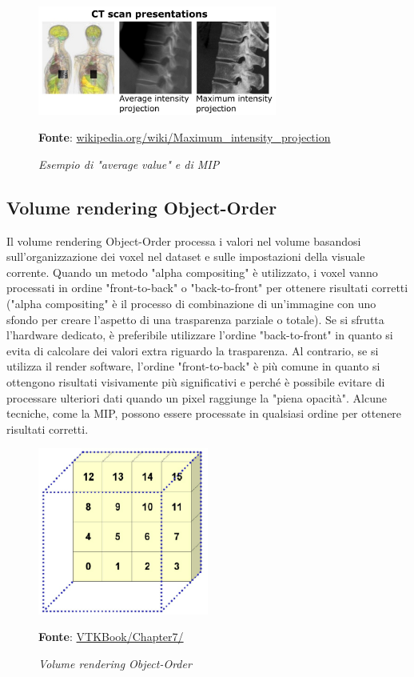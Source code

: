 \begin{figure}[h]
    \centering
    \includegraphics[width=0.7\textwidth]{immagini/volumerendering/mip.jpg}
    \caption{\textit{Esempio di "average value" e di MIP}}
    \textbf{Fonte}: \href{https://en.wikipedia.org/wiki/Maximum_intensity_projection}{wikipedia.org/wiki/Maximum\_intensity\_projection}
    \label{fig: Volume Rendering Example}
\end{figure}

\subsection{Volume rendering Object-Order}\label{sec:volume-object-order}
Il volume rendering Object-Order processa i valori nel volume basandosi sull'organizzazione dei voxel nel dataset e sulle impostazioni della visuale corrente. Quando un metodo "alpha compositing" è utilizzato, i voxel vanno processati in ordine "front-to-back" o "back-to-front" per ottenere risultati corretti ("alpha compositing" è il processo di combinazione di un'immagine con uno sfondo per creare l'aspetto di una trasparenza parziale o totale). Se si sfrutta l'hardware dedicato, è preferibile utilizzare l'ordine "back-to-front" in quanto si evita di calcolare dei valori extra riguardo la trasparenza. Al contrario, se si utilizza il render software, l'ordine "front-to-back" è più comune in quanto si ottengono risultati visivamente più significativi e perché è possibile evitare di processare ulteriori dati quando un pixel raggiunge la "piena opacità". Alcune tecniche, come la MIP, possono essere processate in qualsiasi ordine per ottenere risultati corretti.

\begin{figure}[h]
    \centering
    \includegraphics[width=0.5\textwidth]{immagini/volumerendering/objectorder.png}
    \caption{\textit{Volume rendering Object-Order}}
    \textbf{Fonte}: \href{https://lorensen.github.io/VTKExamples/site/VTKBook/07Chapter7/}{VTKBook/Chapter7/}
    \label{fig: Volume Rendering Object-Order}
\end{figure}

